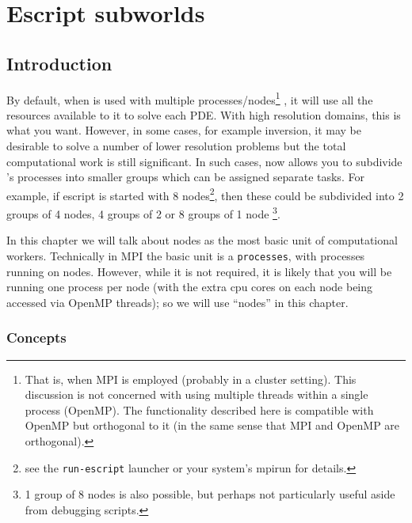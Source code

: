 
%
%
%

\chapter{Escript subworlds}
\label{CHAP:subworld}
\section{Introduction}
By default, when \escript is used with multiple processes/nodes\footnote{That is, when MPI is employed 
(probably in a cluster setting).
This discussion is not concerned with using multiple threads within a single process (OpenMP).
The functionality described here is compatible with OpenMP but orthogonal to it (in the same sense that MPI and OpenMP are
orthogonal).}
, it will use all the resources available to it to solve each PDE.
With high resolution domains, this is what you want.
However, in some cases, for example inversion, it may be desirable to solve a number of lower resolution problems but the
total computational work is still significant.
In such cases, \escript now allows you to subdivide \escript's processes into smaller groups which can be assigned separate 
tasks.
For example, if escript is started with 8 nodes\footnote{see the \texttt{run-escript} launcher or 
your system's mpirun for details.}, then these could be subdivided into 2 groups of 4 nodes, 4 groups of 2 or 8 groups of 1 node
\footnote{1 group of 8 nodes is also possible, but perhaps not particularly useful aside from debugging scripts.}.

In this chapter we will talk about nodes as the most basic unit of computational workers.
Technically in MPI the basic unit is a \texttt{processes}, with processes running on nodes.
However, while it is not required, it is likely that you will be running one process per node (with the extra cpu cores on
each node being accessed via OpenMP threads); so we will use ``nodes'' in this chapter.



\subsection{Concepts}

